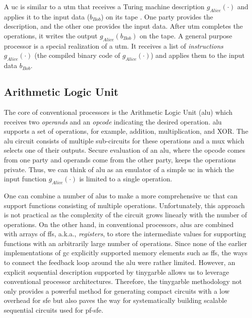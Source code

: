 A \acrshort{uc} is similar to a \acrfull{utm} \cite{turing1936computable,herken1995universal} that receives a Turing machine description $g_{Alice}(\cdot)$ and applies it to the input data ($b_{Bob}$) on its tape \cite{davis2001engines}.
One party provides the description, and the other one provides the input data.
After \acrshort{utm} completes the operations, it writes the output $g_{Alice}(b_{Bob})$ on the tape.
A general purpose processor is a special realization of a \acrshort{utm}.
It receives a list of \emph{instructions} $g_{Alice}(\cdot)$ (the compiled binary code of $g_{Alice}(\cdot)$) and applies them to the input data $b_{Bob}$.

\subsection{Arithmetic Logic Unit}\label{ssec:processor-alu}
The core of conventional processors is the Arithmetic Logic Unit (\acrshort{alu}) which receives two \emph{operands} and an \emph{opcode} indicating the desired operation.
\acrshort{alu} supports a set of operations, for example, addition, multiplication, and XOR.
The \acrshort{alu} circuit consists of multiple sub-circuits for these operations and a \acrshort{mux} which selects one of their outputs.
Secure evaluation of an \acrshort{alu}, where the opcode comes from one party and operands come from the other party, keeps the operations private.
Thus, we can think of \acrshort{alu} as an emulator of a simple \acrshort{uc} in which the input function $g_{Alice}(\cdot)$ is limited to a single operation.

One can combine a number of \acrshort{alu}s to make a more comprehensive \acrshort{uc} that can support functions consisting of multiple operations.
Unfortunately, this approach is not practical as the complexity of the circuit grows linearly with the number of operations.
On the other hand, in conventional processors, \acrshort{alu}s are combined with arrays of \acrshort{ff}s, a.k.a., \emph{registers}, to store the intermediate values for supporting functions with an arbitrarily large number of operations.
Since none of the earlier implementations of \acrshort{gc} explicitly supported memory elements such as \acrshort{ff}s, the ways to connect the feedback loop around the \acrshort{alu} were rather limited.
However, an explicit sequential description supported by \gls{tinygarble} allows us to leverage conventional processor architectures.
Therefore, the \gls{tinygarble} methodology not only provides a powerful method for generating compact circuits with a low overhead for \acrshort{sfe} but also paves the way for systematically building scalable sequential circuits used for \acrshort{pf-sfe}.

